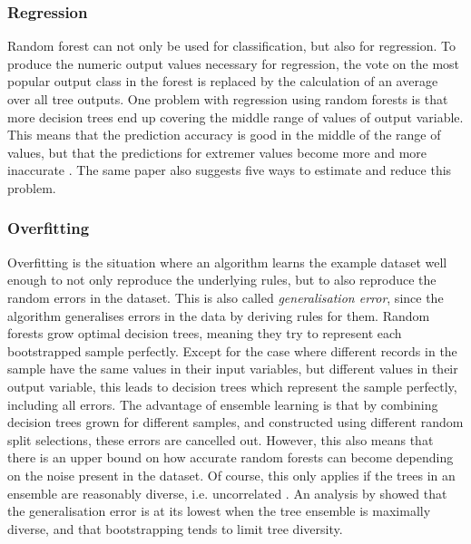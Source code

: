 \documentclass[a4paper,man,12pt,apacite,floatsintext,draftfirst]{apa6} %
\begin{document}
\subsubsection{Regression}
Random forest can not only be used for classification, but also for regression.
To produce the numeric output values necessary for regression,
the vote on the most popular output class in the forest is replaced by the
calculation of an average over all tree outputs.
One problem with regression using random forests is that more decision trees
end up covering the middle range of values of output variable.
This means that the prediction accuracy is good in the middle of the range
of values, but that the predictions for extremer values become more and more
inaccurate \cite{zhang2012bias}.
The same paper also suggests five ways to estimate and reduce this problem.

\subsubsection{Overfitting}
Overfitting \cite{wpOF} is the situation where an algorithm learns the
example dataset well enough to not only reproduce the underlying rules,
but to also reproduce the random errors in the dataset.
This is also called \emph{generalisation error}, since the algorithm
generalises errors in the data by deriving rules for them.
Random forests grow optimal decision trees, meaning they try to represent
each bootstrapped sample perfectly.
Except for the case where different records in the sample have the same
values in their input variables, but different values in their output variable,
this leads to decision trees which represent the sample perfectly,
including all errors.
The advantage of ensemble learning is that by combining decision trees grown
for different samples, and constructed using different random split selections,
these errors are cancelled out.
However, this also means that there is an upper bound on how accurate
random forests can become depending on the noise present in the dataset.
Of course, this only applies if the trees in an ensemble are reasonably
diverse, i.e. uncorrelated \cite{breiman2001random}.
An analysis by  showed that the generalisation error
is at its lowest when the tree ensemble is maximally diverse,
and that bootstrapping tends to limit tree diversity.
\end{document}
